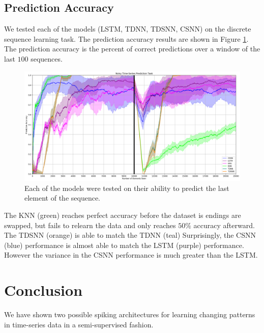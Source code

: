 \documentclass{article}
\begin{document}
\subsection*{Prediction Accuracy}

We tested each of the models (LSTM, TDNN, TDSNN, CSNN) on the discrete sequence learning task. The prediction accuracy results are shown in Figure \ref{fig:prediction-accuracy}. The prediction accuracy is the percent of correct predictions over a window of the last $100$ sequences.

\begin{figure}[H]
    \centering
    \includegraphics[width=0.9\linewidth]{../results/artificial.png}
    \caption{Each of the models were tested on their ability to predict the last element of the sequence.}
    \label{fig:prediction-accuracy}
\end{figure}

The KNN (green) reaches perfect accuracy before the dataset is endings are swapped, but fails to relearn the data and only reaches $50\%$ accuracy afterward. The TDSNN (orange) is able to match the TDNN (teal) Surprisingly, the CSNN (blue) performance is almost able to match the LSTM (purple) performance. However the variance in the CSNN performance is much greater than the LSTM.




\section*{Conclusion}

We have shown two possible spiking architectures for learning changing patterns in time-series data in a semi-supervised fashion.


\newpage
\printbibliography[title={References}]
\end{document}
